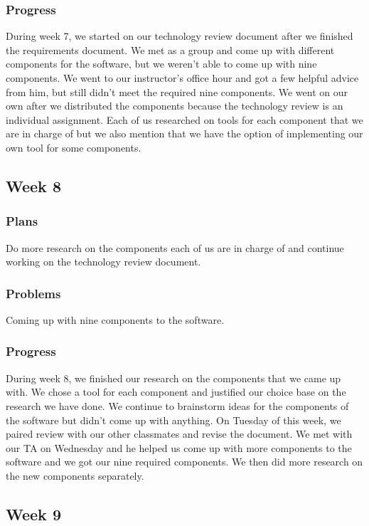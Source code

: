 \documentclass[onecolumn, draftclsnofoot, 10pt, compsoc]{IEEEtran}
\begin{document}
\subsubsection{Progress}
During week 7, we started on our technology review document after we finished the requirements document. We met as a group and come up with different components for the software, but we weren't able to come up with nine components. We went to our instructor's office hour and got a few helpful advice from him, but still didn't meet the required nine components. We went on our own after we distributed the components because the technology review is an individual assignment. Each of us researched on tools for each component that we are in charge of but we also mention that we have the option of implementing our own tool for some components.  


\subsection{Week 8}
\subsubsection{Plans}
Do more research on the components each of us are in charge of and continue working on the technology review document.

\subsubsection{Problems}
Coming up with nine components to the software.
\subsubsection{Progress}
During week 8, we finished our research on the components that we came up with. We chose a tool for each component and justified our choice base on the research we have done. We continue to brainstorm ideas for the components of the software but didn't come up with anything. On Tuesday of this week, we paired review with our other classmates and revise the document. We met with our TA on Wednesday and he helped us come up with more components to the software and we got our nine required components. We then did more research on the new components separately.

\subsection{Week 9}
\end{document}
